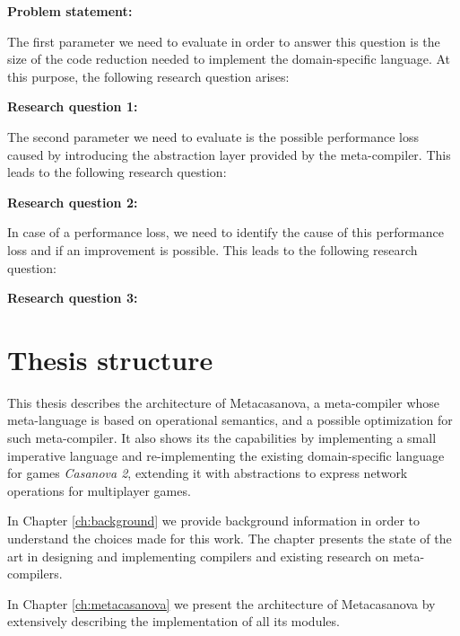 \vspace{0.5cm}
\noindent
\textbf{Problem statement: } \textit{\psContent}

\vspace{0.5cm}
\noindent
The first parameter we need to evaluate in order to answer this question is the size of the code reduction needed to implement the domain-specific language. At this purpose, the following research question arises:

\vspace{0.5cm}
\noindent
\textbf{Research question 1: } \textit{\rqContentOne}

\vspace{0.5cm}
\noindent
The second parameter we need to evaluate is the possible performance loss caused by introducing the abstraction layer provided by the meta-compiler. This leads to the following research question:

\vspace{0.5cm}
\noindent
\textbf{Research question 2: } \textit{\rqContentTwo}

\vspace{0.5cm}
\noindent
In case of a performance loss, we need to identify the cause of this performance loss and if an improvement is possible. This leads to the following research question:

\vspace{0.5cm}
\noindent
\textbf{Research question 3: } \textit{\rqContentThree}

\vspace{0.5cm}
\noindent

\section{Thesis structure}
This thesis describes the architecture of Metacasanova, a meta-compiler whose meta-language is based on operational semantics, and a possible optimization for such meta-compiler. It also shows its the capabilities by implementing a small imperative language and re-implementing the existing domain-specific language for games \textit{Casanova 2}, extending it with abstractions to express network operations for multiplayer games.

In Chapter \ref{ch:background} we provide background information in order to understand the choices made for this work. The chapter presents the state of the art in designing and implementing compilers and existing research on meta-compilers.

In Chapter \ref{ch:metacasanova} we present the architecture of Metacasanova by extensively describing the implementation of all its modules.

